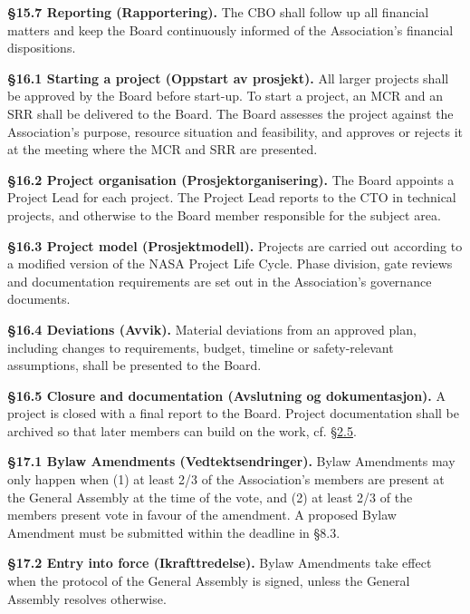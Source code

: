 \documentclass{../../../Common/Latex/Templates/rapport}
\begin{document}
\textbf{\S 15.7 Reporting (Rapportering).}\label{bylaw:15.7} The CBO shall follow up all financial matters and keep the Board continuously informed of the Association's financial dispositions.

\label{bylaw:16}
\textbf{\S 16.1 Starting a project (Oppstart av prosjekt).}\label{bylaw:16.1} All larger projects shall be approved by the Board before start-up. To start a project, an MCR and an SRR shall be delivered to the Board. The Board assesses the project against the Association's purpose, resource situation and feasibility, and approves or rejects it at the meeting where the MCR and SRR are presented.

\textbf{\S 16.2 Project organisation (Prosjektorganisering).}\label{bylaw:16.2} The Board appoints a Project Lead for each project. The Project Lead reports to the CTO in technical projects, and otherwise to the Board member responsible for the subject area.

\textbf{\S 16.3 Project model (Prosjektmodell).}\label{bylaw:16.3} Projects are carried out according to a modified version of the NASA Project Life Cycle. Phase division, gate reviews and documentation requirements are set out in the Association's governance documents.

\textbf{\S 16.4 Deviations (Avvik).}\label{bylaw:16.4} Material deviations from an approved plan, including changes to requirements, budget, timeline or safety-relevant assumptions, shall be presented to the Board.

\textbf{\S 16.5 Closure and documentation (Avslutning og dokumentasjon).}\label{bylaw:16.5} A project is closed with a final report to the Board. Project documentation shall be archived so that later members can build on the work, cf. \hyperref[bylaw:2.5]{\S 2.5}.


\label{bylaw:17}
\textbf{\S 17.1 Bylaw Amendments (Vedtektsendringer).}\label{bylaw:17.1} Bylaw Amendments may only happen when (1) at least 2/3 of the Association's members are present at the General Assembly at the time of the vote, and (2) at least 2/3 of the members present vote in favour of the amendment. A proposed Bylaw Amendment must be submitted within the deadline in \S8.3.

\textbf{\S 17.2 Entry into force (Ikrafttredelse).}\label{bylaw:17.2} Bylaw Amendments take effect when the protocol of the General Assembly is signed, unless the General Assembly resolves otherwise.
\end{document}
